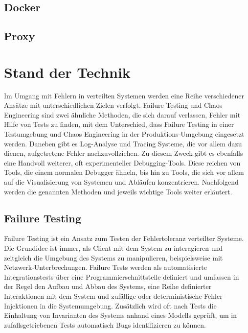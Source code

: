\documentclass[12pt,a4paper]{report}
\begin{document}
\section{Docker}
\section{Proxy}

\chapter{Stand der Technik}
Im Umgang mit Fehlern in verteilten Systemen werden eine Reihe verschiedener Ansätze mit unterschiedlichen Zielen verfolgt.
Failure Testing und Chaos Engineering sind zwei ähnliche Methoden, die sich darauf verlassen, Fehler mit Hilfe von Tests zu
finden, mit dem Unterschied, dass Failure Testing in einer Testumgebung und Chaos Engineering in der Produktions-Umgebung
eingesetzt werden. Daneben gibt es Log-Analyse und Tracing Systeme, die vor allem dazu dienen, aufgetretene Fehler
nachzuvollziehen. Zu diesem Zweck gibt es ebenfalls eine Handvoll weiterer, oft experimenteller Debugging-Tools. Diese reichen von
Tools, die einem normalen Debugger ähneln, bis hin zu Tools, die sich vor allem auf die Visualisierung von Systemen und Abläufen
konzentrieren. Nachfolgend werden die genannten Methoden und jeweils wichtige Tools weiter erläutert. \cite{challenges_and_options}

\section{Failure Testing}
Failure Testing ist ein Ansatz zum Testen der Fehlertoleranz verteilter Systeme. Die Grundidee ist immer, als Client mit dem
System zu interagieren und zeitgleich die Umgebung des Systems zu manipulieren, beispielsweise mit Netzwerk-Unterbrechungen.
Failure Tests werden als automatisierte Integrationstests über eine Programmierschnittstelle definiert und umfassen in der Regel den Aufbau
und Abbau des Systems, eine Reihe definierter Interaktionen mit dem System und zufällige oder deterministische Fehler-Injektionen
in die Systemumgebung. Zusätzlich wird oft nach Tests die Einhaltung von Invarianten des Systems anhand eines Modells geprüft, um
in zufallsgetriebenen Tests automatisch Bugs identifizieren zu können. \cite{failify_masters_thesis}
\end{document}
